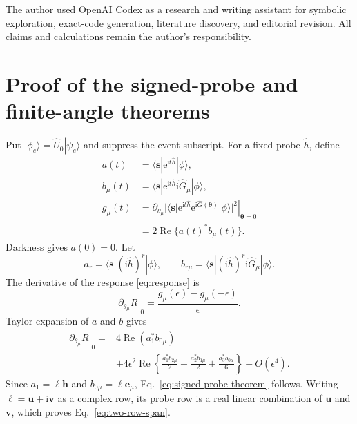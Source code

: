 \documentclass[aps,pra,reprint,amsmath,amssymb,superscriptaddress,longbibliography]{revtex4-2}
\newcommand{\ii}{\mathrm{i}}
\newcommand{\ee}{\mathrm{e}}
\newcommand{\btheta}{\bm{\theta}}
\newcommand{\be}{\bm e}
\begin{document}
\begin{acknowledgments}
The author used OpenAI Codex as a research and writing assistant for
symbolic exploration, exact-code generation, literature discovery, and
editorial revision.  All claims and calculations remain the author's
responsibility.
\end{acknowledgments}

\appendix

\section{Proof of the signed-probe and finite-angle theorems}
\label{app:signed-proof}

Put $|\phi_e\rangle=\widehat U_0|\psi_e\rangle$ and suppress the event
subscript.  For a fixed probe $\widehat h$, define
\begin{align}
 a(t)&=\langle\bm s|\ee^{\ii t\widehat h}|\phi\rangle,\nonumber\\
 b_\mu(t)&=\langle\bm s|\ee^{\ii t\widehat h}
 \ii\widehat G_\mu|\phi\rangle,\nonumber\\
 g_\mu(t)&=\left.\partial_{\theta_\mu}
 |\langle\bm s|\ee^{\ii t\widehat h}
 \ee^{\ii\widehat G(\btheta)}|\phi\rangle|^2
 \right|_{\btheta=0}\nonumber\\
 &=2\operatorname{Re}\{a(t)^*b_\mu(t)\}.
\label{eq:appendix-g}
\end{align}
Darkness gives $a(0)=0$.  Let
\begin{equation}
 a_r=\langle\bm s|(\ii\widehat h)^r|\phi\rangle,\qquad
 b_{r\mu}=\langle\bm s|(\ii\widehat h)^r
 \ii\widehat G_\mu|\phi\rangle .
\end{equation}
The derivative of the response \eqref{eq:response} is
\begin{equation}
 \left.\partial_{\theta_\mu}R\right|_0
 =\frac{g_\mu(\epsilon)-g_\mu(-\epsilon)}{\epsilon}.
\end{equation}
Taylor expansion of $a$ and $b$ gives
\begin{align}
 \left.\partial_{\theta_\mu}R\right|_0
={}&4\operatorname{Re}(a_1^*b_{0\mu})\nonumber\\
&+4\epsilon^2\operatorname{Re}\left\{
\frac{a_1^*b_{2\mu}}2+\frac{a_2^*b_{1\mu}}2
+\frac{a_3^*b_{0\mu}}6\right\}
+O(\epsilon^4).
\label{eq:finite-expansion}
\end{align}
Since $a_1=\ell\bm h$ and $b_{0\mu}=\ell\be_\mu$,
Eq.~\eqref{eq:signed-probe-theorem} follows.  Writing
$\ell=\bm u+\ii\bm v$ as a complex row, its probe row is a real linear
combination of $\bm u$ and $\bm v$, which proves
Eq.~\eqref{eq:two-row-span}.
\end{document}
